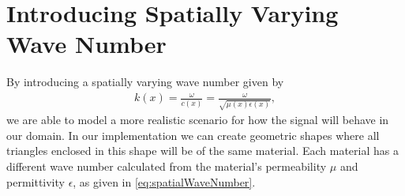 \documentclass[10pt,a4paper]{article}
\begin{document}
\section*{Introducing Spatially Varying Wave Number}
By introducing a spatially varying wave number given by
\begin{align}\label{eq:spatialWaveNumber}
k(x) = \frac{\omega}{c(x)} = \frac{\omega}{\sqrt{\mu(x)\epsilon(x)}},
\end{align}
we are able to model a more realistic scenario for how the signal will behave in our domain. In our implementation we can create geometric shapes where all triangles enclosed in this shape will be of the same material. Each material has a different wave number calculated from the material's permeability $\mu$ and permittivity $\epsilon$, as given in \eqref{eq:spatialWaveNumber}.
\end{document}
